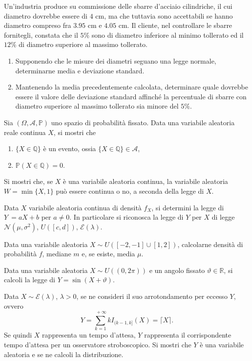 Un'industria produce su commissione delle sbarre d'acciaio cilindriche, il cui diametro dovrebbe essere di $4$ cm, ma che tuttavia sono accettabili se hanno diametro compreso fra $3.95$ cm e $4.05$ cm. Il cliente, nel controllare le sbarre fornitegli, constata che il $5\%$ sono di diametro inferiore al minimo tollerato ed il $12\%$ di diametro superiore al massimo tollerato.
\begin{enumerate}
\item Supponendo che le misure dei diametri seguano una legge normale, determinarne media e deviazione standard.
\item Mantenendo la media precedentemente calcolata, determinare quale dovrebbe essere il valore delle deviazione standard affinché la percentuale di sbarre con diametro superiore al massimo tollerato sia minore del $5\%$.
\end{enumerate}
\Esercizio{}

Sia $( \Omega ,\mathcal{A} ,\mathbb{P})$ uno spazio di probabilità fissato. Data una variabile aleatoria reale continua $X$, si mostri che
\begin{enumerate}
\item $\{X\in \mathbb{Q}\}$ è un evento, ossia $\{X\in \mathbb{Q}\} \in \mathcal{A}$,
\item $\mathbb{P}( X\in \mathbb{Q}) =0$.
\end{enumerate}
\Esercizio{}

Si mostri che, se $X$ è una variabile aleatoria continua, la variabile aleatoria $W=\min\{X,1\}$ può essere continua o no, a seconda della legge di $X$.
\Esercizio{}

Data $X$ variabile aleatoria continua di densità $f_{X}$, si determini la legge di $Y\ =aX+b$ per $a\neq 0$. In particolare si riconosca la legge di $Y$ per $X$ di legge $\mathcal{N}\left( \mu ,\sigma ^{2}\right)$, $U([ c,d])$, $\mathcal{E}( \lambda )$.
\Esercizio{}

Data una variabile aleatoria $X\sim U([ -2,-1] \cup [ 1,2])$, calcolarne densità di probabilità $f$, mediane $m$ e, se esiste, media $\mu $.
\Esercizio{$\star$}

Data una variabile aleatoria $X\sim U(( 0,2\pi ))$ e un angolo fissato $\vartheta \in \mathbb{R}$, si calcoli la legge di $Y=\sin( X+\vartheta )$.
\Esercizio{}

Data $X\sim \mathcal{E}( \lambda )$, $\lambda  >0$, se ne consideri il suo arrotondamento per eccesso $Y$, ovvero
\begin{equation*}
Y=\sum\limits _{k=1}^{\ +\infty } kI_{( k-1,k]}( X) =\lceil X\rceil .
\end{equation*}
Se quindi $X$ rappresenta un tempo d'attesa, $Y$ rappresenta il corrispondente tempo d'attesa per un osservatore stroboscopico. Si mostri che $Y$ è una variabile aleatoria e se ne calcoli la distribuzione.
\Esercizio{}

